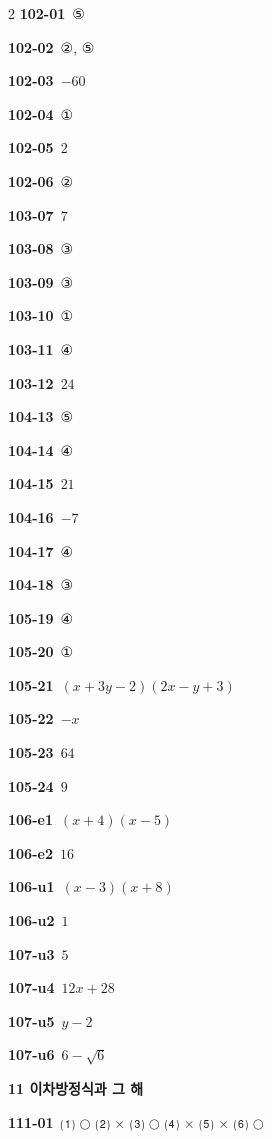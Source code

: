 \documentclass[10pt,a4paper]{article}
\begin{document}
\begin{multicols}{2}
\noindent\textbf{102-01}\ ⑤\par
\noindent\textbf{102-02}\ ②, ⑤\par
\noindent\textbf{102-03}\ $-60$\par
\noindent\textbf{102-04}\ ①\par
\noindent\textbf{102-05}\ $2$\par
\noindent\textbf{102-06}\ ②\par
\noindent\textbf{103-07}\ $7$\par
\noindent\textbf{103-08}\ ③\par
\noindent\textbf{103-09}\ ③\par
\noindent\textbf{103-10}\ ①\par
\noindent\textbf{103-11}\ ④\par
\noindent\textbf{103-12}\ $24$\par
\noindent\textbf{104-13}\ ⑤\par
\noindent\textbf{104-14}\ ④\par
\noindent\textbf{104-15}\ $21$\par
\noindent\textbf{104-16}\ $-7$\par
\noindent\textbf{104-17}\ ④\par
\noindent\textbf{104-18}\ ③\par
\noindent\textbf{105-19}\ ④\par
\noindent\textbf{105-20}\ ①\par
\noindent\textbf{105-21}\ $(x+3y-2)(2x-y+3)$\par
\noindent\textbf{105-22}\ $-x$\par
\noindent\textbf{105-23}\ $64$\par
\noindent\textbf{105-24}\ $9$\par
\noindent\textbf{106-e1}\ $(x+4)(x-5)$\par
\noindent\textbf{106-e2}\ $16$\par
\noindent\textbf{106-u1}\ $(x-3)(x+8)$\par
\noindent\textbf{106-u2}\ $1$\par
\noindent\textbf{107-u3}\ $5$\par
\noindent\textbf{107-u4}\ $12x+28$\par
\noindent\textbf{107-u5}\ $y-2$\par
\noindent\textbf{107-u6}\ $6-\sqrt{6}$\par
\noindent\textbf{11 이차방정식과 그 해}\par\smallskip
\noindent\textbf{111-01}\ ⑴ $\bigcirc$ ⑵ $\times$ ⑶ $\bigcirc$ ⑷ $\times$ ⑸ $\times$ ⑹ $\bigcirc$\par

\end{multicols}
\end{document}
